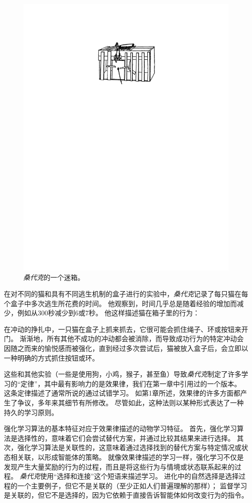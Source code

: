 \begin{figure}[!htb]
	\centering
	\includegraphics[width=0.5\linewidth]{chap11/fig_11_7}
	\caption{\textit{桑代克}的一个迷箱\cite{thorndike1898animal}。  \label{fig:11_7}}
\end{figure}

在对不同的猫和具有不同逃生机制的盒子进行的实验中，\textit{桑代克}记录了每只猫在每个盒子中多次逃生所花费的时间。
他观察到，时间几乎总是随着经验的增加而减少，例如从300秒减少到6或7秒。
他这样描述猫在箱子里的行为：


在冲动的挣扎中，一只猫在盒子上抓来抓去，它很可能会抓住绳子、环或按钮来开门。
渐渐地，所有其他不成功的冲动都会被消除，而导致成功行为的特定冲动会因随之而来的愉悦感而被强化，直到经过多次尝试后，猫被放入盒子后，会立即以一种明确的方式抓住按钮或环\cite{thorndike1898animal}。


这些和其他实验（一些是使用狗，小鸡，猴子，甚至鱼）导致\textit{桑代克}制定了许多学习的“定律”，其中最有影响力的是效果律，我们在第一章中引用过的一个版本。
这条定律描述了通常所说的通过试错学习。
如第1章所述，效果律的许多方面都产生了争议，多年来其细节有所修改。
尽管如此，这种法则以某种形式表达了一种持久的学习原则。


强化学习算法的基本特征对应于效果律描述的动物学习特征。
首先，强化学习算法是选择性的，意味着它们会尝试替代方案，并通过比较其结果来进行选择。
其次，强化学习算法是关联性的，这意味着通过选择找到的替代方案与特定情况或状态相关联，以形成智能体的策略。
就像效果律描述的学习一样，强化学习不仅是发现产生大量奖励的行为的过程，而且是将这些行为与情境或状态联系起来的过程。
\textit{桑代克}使用“选择和连接”这个短语来描述学习。
进化中的自然选择是选择过程的一个主要例子，但它不是关联的（至少正如人们普遍理解的那样）；
监督学习是关联的，但它不是选择的，因为它依赖于直接告诉智能体如何改变行为的指令。


